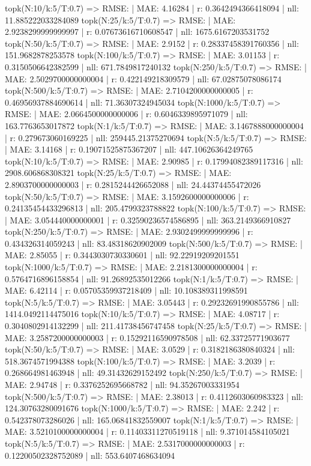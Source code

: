 topk(N:10/k:5/T:0.7) => RMSE: | MAE: 4.16284 | r: 0.3642494366418094 | nll: 11.885222033284089
topk(N:25/k:5/T:0.7) => RMSE: | MAE: 2.9238299999999997 | r: 0.07673616710608547 | nll: 1675.6167203531752
topk(N:50/k:5/T:0.7) => RMSE: | MAE: 2.9152 | r: 0.28337458391760356 | nll: 151.9682878253578
topk(N:100/k:5/T:0.7) => RMSE: | MAE: 3.01153 | r: 0.3150506642382599 | nll: 671.7849817240132
topk(N:250/k:5/T:0.7) => RMSE: | MAE: 2.5029700000000004 | r: 0.422149218309579 | nll: 67.02875078086174
topk(N:500/k:5/T:0.7) => RMSE: | MAE: 2.7104200000000005 | r: 0.46956937884690614 | nll: 71.36307324945034
topk(N:1000/k:5/T:0.7) => RMSE: | MAE: 2.0664500000000006 | r: 0.6046339895971079 | nll: 163.7763653017872
topk(N:1/k:5/T:0.7) => RMSE: | MAE: 3.1467888000000004 | r: 0.279673060169225 | nll: 259445.21375270694
topk(N:5/k:5/T:0.7) => RMSE: | MAE: 3.14168 | r: 0.19071525875367207 | nll: 447.10626364249765
topk(N:10/k:5/T:0.7) => RMSE: | MAE: 2.90985 | r: 0.17994082389117316 | nll: 2908.606868308321
topk(N:25/k:5/T:0.7) => RMSE: | MAE: 2.8903700000000003 | r: 0.2815244426652088 | nll: 24.44374455472026
topk(N:50/k:5/T:0.7) => RMSE: | MAE: 3.1592600000000006 | r: 0.24135454433296813 | nll: 205.4799323788822
topk(N:100/k:5/T:0.7) => RMSE: | MAE: 3.054440000000001 | r: 0.32590236574586895 | nll: 363.2149366910827
topk(N:250/k:5/T:0.7) => RMSE: | MAE: 2.9302499999999996 | r: 0.434326314059243 | nll: 83.48318620902009
topk(N:500/k:5/T:0.7) => RMSE: | MAE: 2.85055 | r: 0.3443030730330601 | nll: 92.22919209201551
topk(N:1000/k:5/T:0.7) => RMSE: | MAE: 2.2181300000000004 | r: 0.5764716896158854 | nll: 91.26892535012266
topk(N:1/k:5/T:0.7) => RMSE: | MAE: 6.42114 | r: 0.05705359937218409 | nll: 10.108389311998591
topk(N:5/k:5/T:0.7) => RMSE: | MAE: 3.05443 | r: 0.29232691990855786 | nll: 1414.0492114475016
topk(N:10/k:5/T:0.7) => RMSE: | MAE: 4.08717 | r: 0.3040802914132299 | nll: 211.41738456747458
topk(N:25/k:5/T:0.7) => RMSE: | MAE: 3.2587200000000003 | r: 0.15292116590978508 | nll: 62.33725771903677
topk(N:50/k:5/T:0.7) => RMSE: | MAE: 3.0529 | r: 0.3182186380840324 | nll: 518.3674571994388
topk(N:100/k:5/T:0.7) => RMSE: | MAE: 3.2039 | r: 0.268664981463948 | nll: 49.31432629152492
topk(N:250/k:5/T:0.7) => RMSE: | MAE: 2.94748 | r: 0.3376252695668782 | nll: 94.35267003331954
topk(N:500/k:5/T:0.7) => RMSE: | MAE: 2.38013 | r: 0.4112603060983323 | nll: 124.30763280091676
topk(N:1000/k:5/T:0.7) => RMSE: | MAE: 2.242 | r: 0.542378073286026 | nll: 165.06841832559007
topk(N:1/k:5/T:0.7) => RMSE: | MAE: 3.5210100000000004 | r: 0.11403311270519118 | nll: 9.371014584105021
topk(N:5/k:5/T:0.7) => RMSE: | MAE: 2.5317000000000003 | r: 0.12200502328752089 | nll: 553.6407468634094
